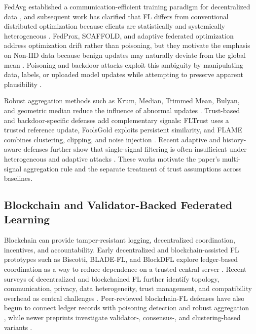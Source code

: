 \documentclass[preprint,12pt]{elsarticle}
\begin{document}
FedAvg established a communication-efficient training paradigm for decentralized data \citep{mcmahan2017fedavg}, and subsequent work has clarified that FL differs from conventional distributed optimization because clients are statistically and systemically heterogeneous \citep{kairouz2021advances}. FedProx, SCAFFOLD, and adaptive federated optimization address optimization drift rather than poisoning, but they motivate the emphasis on Non-IID data because benign updates may naturally deviate from the global mean \citep{li2020fedprox,karimireddy2020scaffold,reddi2021fedopt}. Poisoning and backdoor attacks exploit this ambiguity by manipulating data, labels, or uploaded model updates while attempting to preserve apparent plausibility \citep{fang2020local,bagdasaryan2020backdoor,baruch2019little,xie2020dba,nguyen2022flame}.

Robust aggregation methods such as Krum, Median, Trimmed Mean, Bulyan, and geometric median reduce the influence of abnormal updates \citep{blanchard2017krum,yin2018byzantine,elmhamdi2018bulyan,pillutla2022rfa}. Trust-based and backdoor-specific defenses add complementary signals: FLTrust uses a trusted reference update, FoolsGold exploits persistent similarity, and FLAME combines clustering, clipping, and noise injection \citep{cao2021fltrust,fung2020foolsgold,nguyen2022flame}. Recent adaptive and history-aware defenses further show that single-signal filtering is often insufficient under heterogeneous and adaptive attacks \citep{wang2025adaaggrl,wang2025fedhan}. These works motivate the paper's multi-signal aggregation rule and the separate treatment of trust assumptions across baselines.

\subsection{Blockchain and Validator-Backed Federated Learning}

Blockchain can provide tamper-resistant logging, decentralized coordination, incentives, and accountability. Early decentralized and blockchain-assisted FL prototypes such as Biscotti, BLADE-FL, and BlockDFL explore ledger-based coordination as a way to reduce dependence on a trusted central server \citep{shayan2018biscotti,li2021bladefl,qin2022blockdfl}. Recent surveys of decentralized and blockchained FL further identify topology, communication, privacy, data heterogeneity, trust management, and compatibility overhead as central challenges \citep{yuan2024dflsurvey,jiang2023blockflsurvey,hallaji2024dflsecurity}. Peer-reviewed blockchain-FL defenses have also begun to connect ledger records with poisoning detection and robust aggregation \citep{dong2024blockchain,zhang2024bitfl,ren2024bpfl}, while newer preprints investigate validator-, consensus-, and clustering-based variants \citep{garcia2025kfc,carney2025fidelis,bouchiha2026abc}.
\end{document}
